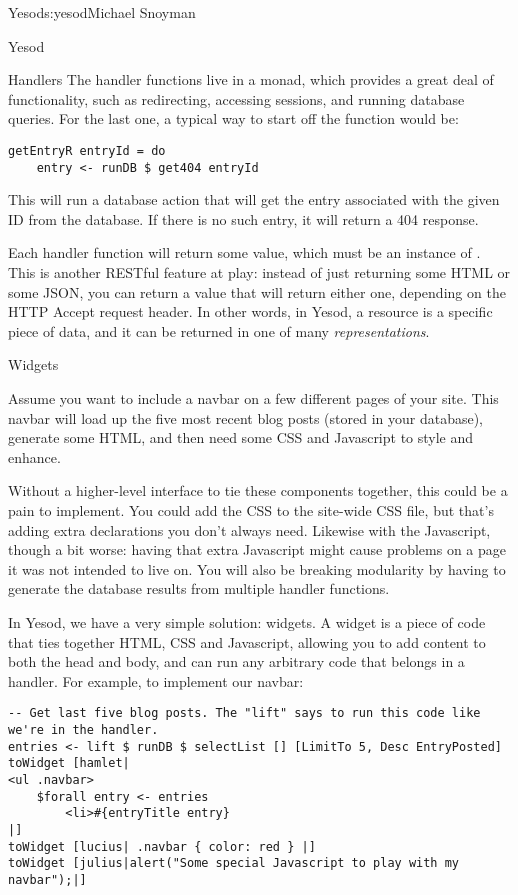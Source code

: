 \begin{aosachapter}{Yesod}{s:yesod}{Michael Snoyman}
\begin{aosasect1}{Yesod}
\begin{aosasect2}{Handlers}
The handler functions live in a  monad, which provides a
great deal of functionality, such as redirecting, accessing sessions,
and running database queries. For the last one, a typical way to start
off the  function would be:

\begin{verbatim}
getEntryR entryId = do
    entry <- runDB $ get404 entryId
\end{verbatim}

This will run a database action that will get the entry associated
with the given ID from the database. If there is no such entry, it
will return a 404 response.

Each handler function will return some value, which must be an
instance of . This is another RESTful feature at play:
instead of just returning some HTML or some JSON, you can return a
value that will return either one, depending on the HTTP Accept
request header. In other words, in Yesod, a resource is a specific
piece of data, and it can be returned in one of many
\emph{representations}.

\end{aosasect2}

\begin{aosasect2}{Widgets}

Assume you want to include a navbar on a few different pages of your
site. This navbar will load up the five most recent blog posts (stored
in your database), generate some HTML, and then need some CSS and
Javascript to style and enhance.

Without a higher-level interface to tie these components together,
this could be a pain to implement. You could add the CSS to the
site-wide CSS file, but that's adding extra declarations you don't
always need. Likewise with the Javascript, though a bit worse: having
that extra Javascript might cause problems on a page it was not
intended to live on. You will also be breaking modularity by having to
generate the database results from multiple handler functions.

In Yesod, we have a very simple solution: widgets. A widget is a piece
of code that ties together HTML, CSS and Javascript, allowing you to
add content to both the head and body, and can run any arbitrary code
that belongs in a handler. For example, to implement our navbar:

\begin{verbatim}
-- Get last five blog posts. The "lift" says to run this code like we're in the handler.
entries <- lift $ runDB $ selectList [] [LimitTo 5, Desc EntryPosted]
toWidget [hamlet|
<ul .navbar>
    $forall entry <- entries
        <li>#{entryTitle entry}
|]
toWidget [lucius| .navbar { color: red } |]
toWidget [julius|alert("Some special Javascript to play with my navbar");|]
\end{verbatim}


\end{aosasect2}
\end{aosasect1}
\end{aosachapter}

